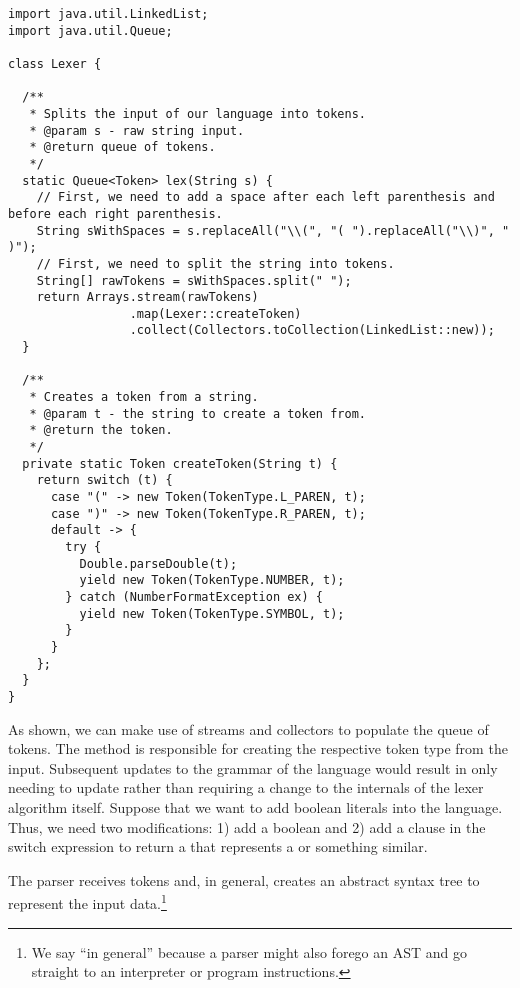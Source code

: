 \begin{lstlisting}[language=MyJava]
import java.util.LinkedList;
import java.util.Queue;

class Lexer {

  /**
   * Splits the input of our language into tokens.
   * @param s - raw string input.
   * @return queue of tokens.
   */
  static Queue<Token> lex(String s) {
    // First, we need to add a space after each left parenthesis and before each right parenthesis.
    String sWithSpaces = s.replaceAll("\\(", "( ").replaceAll("\\)", " )");
    // First, we need to split the string into tokens.
    String[] rawTokens = sWithSpaces.split(" ");
    return Arrays.stream(rawTokens)
                 .map(Lexer::createToken)
                 .collect(Collectors.toCollection(LinkedList::new));
  }

  /**
   * Creates a token from a string.
   * @param t - the string to create a token from.
   * @return the token.
   */
  private static Token createToken(String t) {
    return switch (t) {
      case "(" -> new Token(TokenType.L_PAREN, t);
      case ")" -> new Token(TokenType.R_PAREN, t);
      default -> {
        try {
          Double.parseDouble(t);
          yield new Token(TokenType.NUMBER, t);
        } catch (NumberFormatException ex) {
          yield new Token(TokenType.SYMBOL, t);
        }
      }
    };
  }
}
\end{lstlisting}

As shown, we can make use of streams and collectors to populate the queue of tokens. 
The  method is responsible for creating the respective token type from the input. 
Subsequent updates to the grammar of the language would result in only needing to update  rather than requiring a change to the internals of the lexer algorithm itself. 
Suppose that we want to add boolean literals into the language. Thus, we need two modifications: 1) add a boolean  and 2) add a clause in the switch expression to return a  that represents a  or something similar.

The parser receives tokens and, in general, creates an abstract syntax tree to represent the input data.\footnote{We say ``in general'' because a parser might also forego an AST and go straight to an interpreter or program instructions.}

